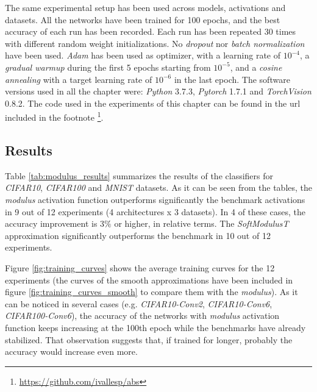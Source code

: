 The same experimental setup has been used across models, activations and datasets. All the networks have been trained for 100 epochs, and the best accuracy of each run has been recorded. Each run has been repeated 30 times with different random weight initializations. No \textit{dropout} \autocite{srivastava2014} nor \textit{batch normalization} \autocite{ioffe2015} have been used. \textit{Adam} \autocite{kingma14} has been used as optimizer, with a learning rate of $10^{-4}$, a \textit{gradual warmup} \autocite{gotmare2018} during the first 5 epochs starting from $10^{-5}$, and a \textit{cosine annealing} \autocite{loshchilov2017} with a target learning rate of $10^{-6}$ in the last epoch. The software versions used in all the chapter were: \textit{Python} 3.7.3, \textit{Pytorch} 1.7.1 and  \textit{TorchVision} 0.8.2. The code used in the experiments of this chapter can be found in the url included in the footnote \footnote{\url{https://github.com/ivallesp/abs}}.


\subsection{Results}
Table \ref{tab:modulus_results} summarizes the results of the classifiers for \textit{CIFAR10}, \textit{CIFAR100} and \textit{MNIST} datasets. As it can be seen from the tables, the \textit{modulus} activation function outperforms significantly the benchmark activations in 9 out of 12 experiments (4 architectures x 3 datasets). In 4 of these cases, the accuracy improvement is $3\%$ or higher, in relative terms. The \textit{SoftModulusT} approximation significantly outperforms the benchmark in 10 out of 12 experiments.

Figure \ref{fig:training_curves} shows the average training curves for the 12 experiments (the curves of the smooth approximations have been included in figure \ref{fig:training_curves_smooth} to compare them with the \textit{modulus}). As it can be noticed in several cases (e.g. \textit{CIFAR10-Conv2}, \textit{CIFAR10-Conv6}, \textit{CIFAR100-Conv6}), the accuracy of the networks with \textit{modulus} activation function keeps increasing at the 100th epoch while the benchmarks have already stabilized. That observation suggests that, if trained for longer, probably the accuracy would increase even more.


